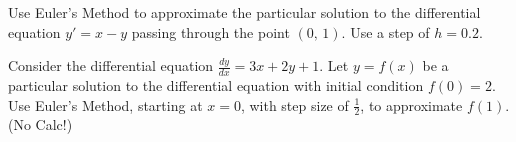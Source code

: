 \begin{questions}
    \question Use Euler's Method to approximate the particular solution to the differential equation $y'=x-y$ passing through the point $(0,\,1)$. Use a step of $h=0.2.$
    
    
    \question Consider the differential equation $\displaystyle\frac{dy}{dx}=3x+2y+1$. Let $y=f(x)$ be a particular solution to the differential equation with initial condition $f(0)=2$. Use Euler's Method, starting at $x=0$, with step size of $\frac{1}{2}$, to approximate $f(1)$. (No Calc!)
    
\end{questions}




\newpage
